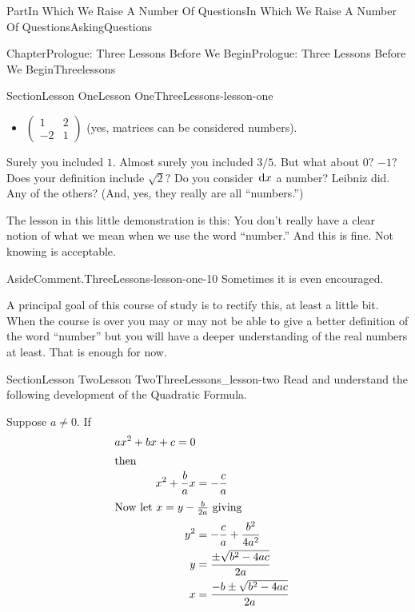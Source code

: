 \documentclass[oneside,10pt,]{book}
\numberwithin{equation}{part}
\newcommand{\dx}[1]{\,{\rm d}#1}
\newcommand{\amp}{&}
\begin{document}
\begin{partptx}{Part}{In Which We Raise A Number Of Questions}{}{In Which We Raise A Number Of Questions}{}{}{AskingQuestions}
\begin{chapterptx}{Chapter}{Prologue: Three Lessons Before We Begin}{}{Prologue: Three Lessons Before We Begin}{}{}{Threelessons}
\begin{sectionptx}{Section}{Lesson One}{}{Lesson One}{}{}{ThreeLessons-lesson-one}
\begin{itemize}[label=\textbullet]
\item{}\(\begin{pmatrix}
1\amp 2\\
-2\amp 1
\end{pmatrix}\) (yes, matrices can be considered numbers).%
\end{itemize}
%
\par
Surely you included \(1\).  Almost surely you included \(3/5\).  But what about \(0?\) \(-1?\) Does your definition include \(\sqrt{2}?\) Do you consider \(\dx{x}\) a number?  Leibniz did.  Any of the others? (And, yes, they really are all ``numbers.'')%
\par
The lesson in this little demonstration is this: You don't really have a clear notion of what we mean when we use the word ``number.'' And this is fine.  Not knowing is acceptable.%
\begin{aside}{Aside}{Comment.}{ThreeLessons-lesson-one-10}%
Sometimes it is even encouraged.%
\end{aside}
A principal goal of this course of study is to rectify this, at least a little bit.  When the course is over you may or may not be able to give a better definition of the word ``number'' but you will have a deeper understanding of the real numbers at least.  That is enough for now.%
\end{sectionptx}
%
%
\typeout{************************************************}
\typeout{************************************************}
%
\begin{sectionptx}{Section}{Lesson Two}{}{Lesson Two}{}{}{ThreeLessons_lesson-two}
Read and understand the following development of the Quadratic Formula.%
\par
Suppose \(a\neq0\).  If%
\begin{align}
ax^2+bx+c =0\label{eq_QForm1}\\
\intertext{then}
x^2+\frac{b}{a}x\amp =-\frac{c}{a}\label{eq_QForm2}\\
\intertext{Now let \(x=y-\frac{b}{2a}\) giving}
y^2\amp = -\frac{c}{a} +\frac{b^2}{4a^2}\label{eq_QForm3}\\
y\amp = \frac{\pm \sqrt{b^2-4ac}}{2a}\label{ThreeLessons_lesson-two-3-2-6}\\
x\amp = \frac{-b\pm\sqrt{b^2-4ac}}{2a}\label{eq_QForm4}
\end{align}
%
\par

\end{sectionptx}
\end{chapterptx}
\end{partptx}
\end{document}
